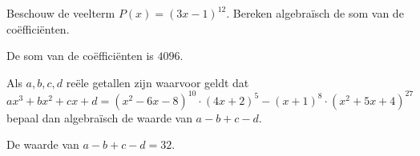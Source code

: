 \documentclass{ximera}
\begin{document}
\begin{exercise}
Beschouw de veelterm \(P(x) = (3x - 1)^{12}\). Bereken algebraïsch de som van de coëfficiënten. 
\begin{oplossing} De som van de coëfficiënten is \(4096\). \end{oplossing}
\end{exercise}

\begin{exercise}
Als \(a,b,c,d\) reële getallen zijn waarvoor geldt dat
\[
ax^3 + bx^2 + cx + d = (x^2-6x-8)^{10}\cdot(4x+2)^5 - (x+1)^8\cdot(x^2+5x+4)^{27}
\]
bepaal dan algebraïsch de waarde van \(a-b+c-d\).
\begin{oplossing} De waarde van \(a-b+c-d = 32\).\end{oplossing}
\end{exercise}
\end{document}
